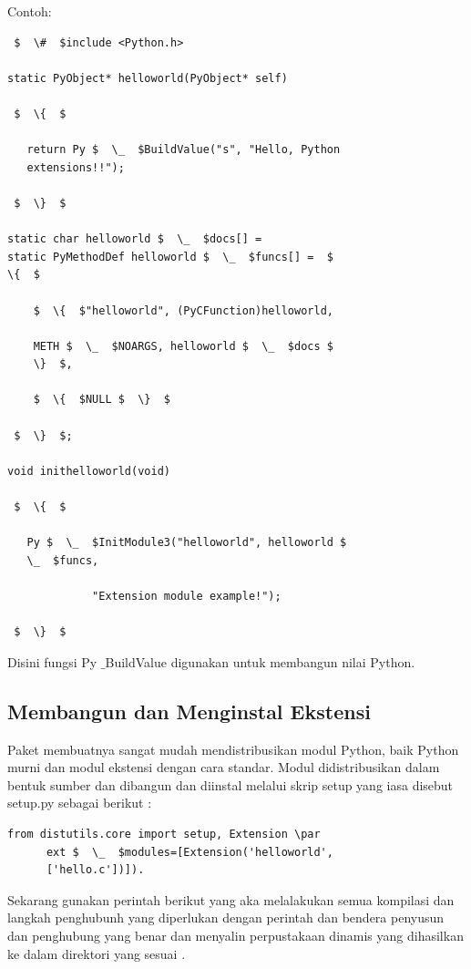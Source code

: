 \vspace{12pt}
Contoh: 
\begin{verbatim} 
 $  \#  $include <Python.h> 
 
static PyObject* helloworld(PyObject* self) 

 $  \{  $ 
 
   return Py $  \_  $BuildValue("s", "Hello, Python 
   extensions!!"); 

 $  \}  $ 
 
static char helloworld $  \_  $docs[] = 
static PyMethodDef helloworld $  \_  $funcs[] =  $  
\{  $ 

    $  \{  $"helloworld", (PyCFunction)helloworld,  

    METH $  \_  $NOARGS, helloworld $  \_  $docs $  
    \}  $, 

    $  \{  $NULL $  \}  $
 
 $  \}  $; 
 
void inithelloworld(void) 
 
 $  \{  $ 

   Py $  \_  $InitModule3("helloworld", helloworld $  
   \_  $funcs, 

             "Extension module example!"); 
 
 $  \}  $ 
\end{verbatim}

\vspace{12pt} 
\hspace*{0.5in} Disini fungsi Py $  \_  $BuildValue digunakan untuk membangun nilai Python.  

\vspace{12pt} 
\subsection{Membangun dan Menginstal Ekstensi} 

\hspace*{0.5in} Paket membuatnya sangat mudah mendistribusikan modul Python, baik Python murni dan modul ekstensi dengan cara standar. Modul didistribusikan dalam bentuk sumber dan dibangun dan diinstal melalui skrip setup yang iasa disebut setup.py sebagai berikut : 
 
\begin{verbatim}
from distutils.core import setup, Extension \par
      ext $  \_  $modules=[Extension('helloworld', 
      ['hello.c'])]). 
\end{verbatim}

\vspace{12pt}
\hspace*{0.5in} Sekarang gunakan perintah berikut yang aka melalakukan semua kompilasi dan langkah penghubunh yang diperlukan dengan perintah dan bendera penyusun dan penghubung yang benar dan menyalin perpustakaan dinamis yang dihasilkan ke dalam direktori yang sesuai . 
\vspace{12pt}
 
